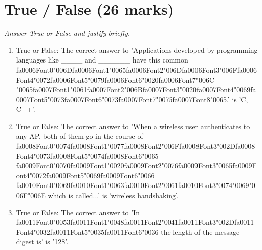 \documentclass[12pt]{article}
\begin{document}
\section*{True / False (26 marks)}
\textit{Answer True or False and justify briefly.}
\begin{enumerate}[label=\arabic*.]
\item True or False: The correct answer to 'Applications developed by programming languages like \_\_\_\_ and \_\_\_\_\_\_ have this common {\csname fa0006Font0\endcsname\char"006D}{\csname fa0006Font1\endcsname\char"0065}{\csname fa0006Font2\endcsname\char"006D}{\csname fa0006Font3\endcsname\char"006F}{\csname fa0006Font4\endcsname\char"0072}{\csname fa0006Font5\endcsname\char"0079}{\csname fa0006Font6\endcsname\char"0020}{\csname fa0006Font7\endcsname\char"006C} {\char"0065}{\csname fa0007Font1\endcsname\char"0061}{\csname fa0007Font2\endcsname\char"006B}{\csname fa0007Font3\endcsname\char"0020}{\csname fa0007Font4\endcsname\char"0069}{\csname fa0007Font5\endcsname\char"0073}{\csname fa0007Font6\endcsname\char"0073}{\csname fa0007Font7\endcsname\char"0075}{\csname fa0007Font8\endcsname\char"0065}.' is 'C, C++'.
\item True or False: The correct answer to 'When a wireless user authenticates to any AP, both of them go in the course of {\csname fa0008Font0\endcsname\char"0074}{\csname fa0008Font1\endcsname\char"0077}{\csname fa0008Font2\endcsname\char"006F}{\csname fa0008Font3\endcsname\char"002D}{\csname fa0008Font4\endcsname\char"0073}{\csname fa0008Font5\endcsname\char"0074}{\csname fa0008Font6\endcsname\char"0065} {\csname fa0009Font0\endcsname\char"0070}{\csname fa0009Font1\endcsname\char"0020}{\csname fa0009Font2\endcsname\char"0076}{\csname fa0009Font3\endcsname\char"0065}{\csname fa0009Font4\endcsname\char"0072}{\csname fa0009Font5\endcsname\char"0069}{\csname fa0009Font6\endcsname\char"0066} {\csname fa0010Font0\endcsname\char"0069}{\csname fa0010Font1\endcsname\char"0063}{\csname fa0010Font2\endcsname\char"0061}{\csname fa0010Font3\endcsname\char"0074}{\char"0069}{\char"006F}{\char"006E} which is called...' is 'wireless handshaking'.
\item True or False: The correct answer to 'In {\csname fa0011Font0\endcsname\char"0053}{\csname fa0011Font1\endcsname\char"0048}{\csname fa0011Font2\endcsname\char"0041}{\csname fa0011Font3\endcsname\char"002D}{\csname fa0011Font4\endcsname\char"0032}{\csname fa0011Font5\endcsname\char"0035}{\csname fa0011Font6\endcsname\char"0036} the length of the message digest is' is '128'.

\end{enumerate}
\end{document}
